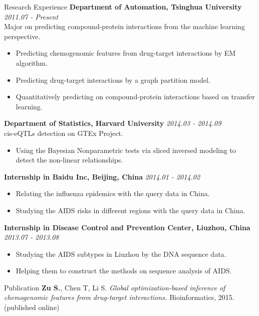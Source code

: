 \documentclass{resume} %
\begin{document}
\begin{rSection}{Research Experience}
{\bf Department of Automation, Tsinghua University} \hfill {\em 2011.07 - Present}\\
Major on predicting compound-protein interactions from the machine learning perspective.
\vspace{-3mm}
\begin{itemize}
\item Predicting chemogenomic features from drug-target interactions by EM algorithm.
\item Predicting drug-target interactions by a graph partition model.
\item Quantitatively predicting on compound-protein interactions based on transfer learning.
\end{itemize}
{\bf Department of Statistics, Harvard University} \hfill {\em 2014.03 - 2014.09} \\
cis-eQTLs detection on GTEx Project.
\vspace{-3mm}
\begin{itemize}
\item Using the Bayesian Nonparametric tests via sliced inversed modeling to detect the non-linear relationships.
\end{itemize}
{\bf Internship in Baidu Inc, Beijing, China} \hfill {\em 2014.01 - 2014.02}
\vspace{-3mm}
\begin{itemize}
\item  Relating the influenza epidemics with the query data in China.
\item  Studying the AIDS risks in different regions with the query data in China.
\end{itemize}
{\bf Internship in Disease Control and Prevention Center, Liuzhou, China} \hfill {\em 2013.07 - 2013.08}
\vspace{-3mm}
\begin{itemize}
\item Studying the AIDS subtypes in Liuzhou by the DNA sequence data.
\item Helping them to construct the methods on sequence analysis of AIDS. 
\end{itemize}
\end{rSection}

\begin{rSection}{Publication}
{\bf Zu S.}, Chen T, Li S. {\it Global optimization-based inference of chemogenomic features from drug-target interactions.} Bioinformatics, 2015.
(published online)
\end{rSection}
\end{document}
